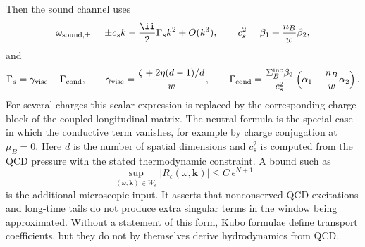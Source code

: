 \begin{controlledapproximation}
Then the sound channel uses
\[
  \omega_{\rm sound,\pm}
  =
  \pm c_s k
  -\frac{\ii}{2}\Gamma_s k^2
  +O(k^3),
  \qquad
  c_s^2=\beta_1+\frac{n_B}{w}\beta_2,
\]
and
\begin{equation}
  \Gamma_s
  =
  \gamma_{\rm visc}
  +
  \Gamma_{\rm cond},
  \qquad
  \gamma_{\rm visc}
  =
  \frac{\zeta+2\eta(d-1)/d}{w},
  \qquad
  \Gamma_{\rm cond}
  =
  \frac{\Sigma_B^{\rm inc}\beta_2}{c_s^2}
  \left(\alpha_1+\frac{n_B}{w}\alpha_2\right).
  \label{eq:qcd-charged-sound-attenuation}
\end{equation}
For several charges this scalar expression is replaced by the corresponding
charge block of the coupled longitudinal matrix.  The neutral formula is the
special case in which the conductive term vanishes, for example by charge
conjugation at \(\mu_B=0\).
Here \(d\) is the number of spatial dimensions and \(c_s^2\) is computed from
the QCD pressure with the stated thermodynamic constraint.  A bound such as
\begin{equation}
  \sup_{(\omega,\mathbf k)\in W_\epsilon}
  |R_\epsilon(\omega,\mathbf k)|
  \le C\,\epsilon^{N+1}
  \label{eq:qcd-hydro-response-remainder}
\end{equation}
is the additional microscopic input.  It asserts that nonconserved QCD
excitations and long-time tails do not produce extra singular terms in the
window being approximated.  Without a statement of this form, Kubo formulae
define transport coefficients, but they do not by themselves derive
hydrodynamics from QCD.
\end{controlledapproximation}

